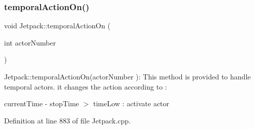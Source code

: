 \subsubsection{\texorpdfstring{temporal\+Action\+On()}{temporalActionOn()}}
{\footnotesize\ttfamily void Jetpack\+::temporal\+Action\+On (\begin{DoxyParamCaption}\item[{int}]{actor\+Number }\end{DoxyParamCaption})}

Jetpack\+::temporal\+Action\+On(actor\+Number )\+: This method is provided to handle temporal actors. it changes the action according to \+:

current\+Time -\/ stop\+Time $>$ time\+Low \+: activate actor 

Definition at line 883 of file Jetpack.\+cpp.


